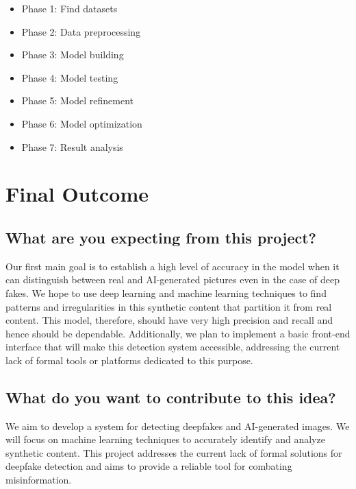 \documentclass[10pt,twocolumn,letterpaper]{article}
\begin{document}
\begin{itemize}\setlength\itemsep{-0.4em}
    \item Phase 1: Find datasets \hfill {}
    \item Phase 2: Data preprocessing \hfill {}
    \item Phase 3: Model building \hfill {}
    \item Phase 4: Model testing \hfill {}
    \item Phase 5: Model refinement \hfill {}
    \item Phase 6: Model optimization \hfill {}
    \item Phase 7: Result analysis \hfill {}
\end{itemize}


\section{Final Outcome}

\subsection{What are you expecting from this project?}

Our first main goal is to establish a high level of accuracy in the model when it can distinguish between real and AI-generated pictures even in the case of deep fakes. 
We hope to use deep learning and machine learning techniques to find patterns and irregularities in this synthetic content that partition it from real content. 
This model, therefore, should have very high precision and recall and hence should be dependable.
Additionally, we plan to implement a basic front-end interface that will make this detection system accessible, addressing the current lack of formal tools or platforms dedicated to this purpose.

\subsection{What do you want to contribute to this idea?}
We aim to develop a system for detecting deepfakes and AI-generated images. We will focus on machine learning techniques to accurately identify and analyze synthetic content. This project addresses the current lack of formal solutions for deepfake detection and aims to provide a reliable tool for combating misinformation.
\end{document}
